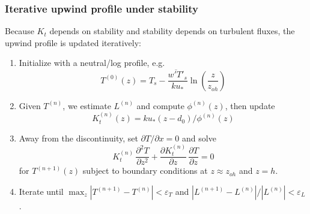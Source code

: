 \documentclass{article}
\begin{document}
    \subsubsection*{Iterative upwind profile under stability}
    
    Because $K_t$ depends on stability and stability depends on turbulent fluxes,  the
    upwind profile is updated iteratively:
    
    \begin{enumerate}
    \item Initialize with a neutral/log profile, e.g.\
    $$T^{(0)}(z)=T_s-\frac{\overline{w'T'}_s}{k u_*}\ln\!\left(\frac{z}{z_{oh}}\right)$$
    \item Given $T^{(n)}$, we estimate $L^{(n)}$ and compute $\phi^{(n)}(z)$, then update $$K_t^{(n)}(z)=k u_*(z-d_0)/\phi^{(n)}(z)$$
    \item Away from the discontinuity, set $\partial T/\partial x=0$ and solve
    \begin{equation}
    K_t^{(n)}\,\frac{\partial^2 T}{\partial z^2}
    +
    \frac{\partial K_t^{(n)}}{\partial z}\,\frac{\partial T}{\partial z}=0
    \end{equation}
    for $T^{(n+1)}(z)$ subject to boundary conditions at $z\approx z_{oh}$ and $z=h$.
    \item Iterate until $\max_z |T^{(n+1)}-T^{(n)}|<\varepsilon_T$ and $|L^{(n+1)}-L^{(n)}|/|L^{(n)}|<\varepsilon_L$.
    \end{enumerate}
    
    
    
    
    
    
\end{document}
